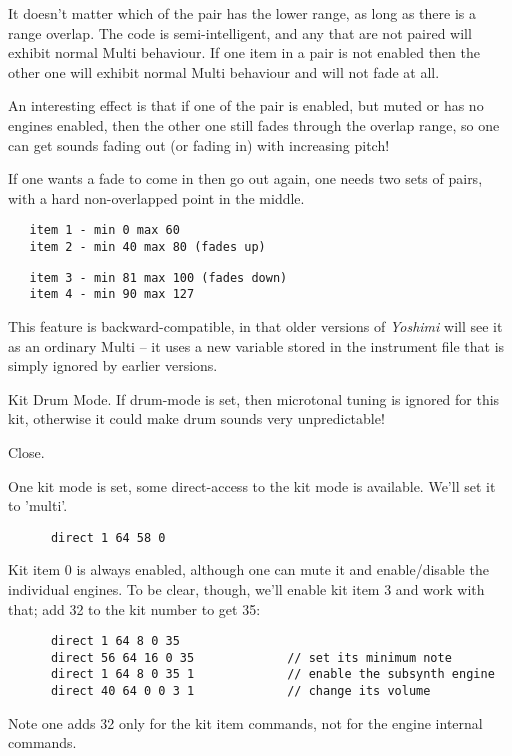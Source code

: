    It doesn't matter which of the pair has the lower range, as long as there is
   a range overlap. The code is semi-intelligent, and any that are not paired
   will exhibit normal Multi behaviour. If one item in a pair is not enabled
   then the other one will exhibit normal Multi behaviour and will not fade at
   all.

   An interesting effect is that if one of the pair is enabled, but muted or
   has no engines enabled, then the other one still fades through the overlap
   range, so one can get sounds fading out (or fading in) with increasing
   pitch!

   If one wants a fade to come in then go out again, one needs two sets of pairs,
   with a hard non-overlapped point in the middle.

   \begin{verbatim}
   item 1 - min 0 max 60
   item 2 - min 40 max 80 (fades up)
   \end{verbatim}

   \begin{verbatim}
   item 3 - min 81 max 100 (fades down)
   item 4 - min 90 max 127
   \end{verbatim}

   This feature is backward-compatible, in that older versions of
   \textsl{Yoshimi} will
   see it as an ordinary Multi -- it uses a new variable stored in the
   instrument file that is simply ignored by earlier versions.

   Kit Drum Mode.
   If drum-mode  is set, then microtonal tuning is ignored for this kit,
   otherwise it could make drum sounds very unpredictable!

   Close.

   One kit mode is set, some direct-access to the kit mode is available.
 	We'll set it to 'multi'.

   \begin{verbatim}
      direct 1 64 58 0
   \end{verbatim}

   Kit item 0 is always enabled, although one can mute it and enable/disable the
   individual engines.  To be clear, though, we'll enable kit item 3 and work
   with that; add 32 to the kit number to get 35:

   \begin{verbatim}
      direct 1 64 8 0 35
      direct 56 64 16 0 35             // set its minimum note
      direct 1 64 8 0 35 1             // enable the subsynth engine
      direct 40 64 0 0 3 1             // change its volume
   \end{verbatim}

   Note one adds 32 only for the kit item commands, not for the engine internal
   commands.

